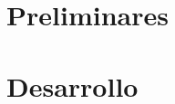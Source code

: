 \documentclass[a4paper,twoside,12pt]{book}
\begin{document}
\thispagestyle{empty}\pagestyle{empty}
\maketitle             %

\frontmatter \pagestyle{plain}

%
%
\tableofcontents
\listoffigures
%
\mainmatter\pagestyle{fancy}

\part{Preliminares}



\part{Desarrollo}

%
%
%


\appendix






\end{document}
